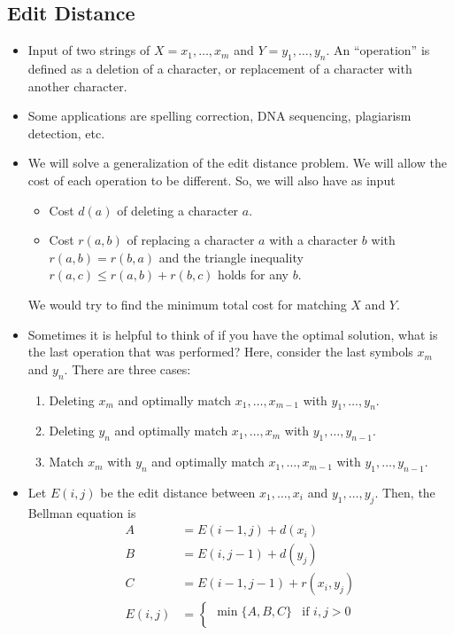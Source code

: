 \documentclass[a4paper,12pt]{article}
\begin{document}
\subsection{Edit Distance}
\begin{itemize}
    \item Input of two strings of $X=x_1,\dots,x_m$ and $Y=y_1,\dots,y_n$. An ``operation'' is defined as a deletion of a character, or replacement of a character with another character.
    \item Some applications are spelling correction, DNA sequencing, plagiarism detection, etc.
    \item We will solve a generalization of the edit distance problem. We will allow the cost of each operation to be different. So, we will also have as input \begin{itemize}
        \item Cost $d(a)$ of deleting a character $a$.
        \item Cost $r(a,b)$ of replacing a character $a$ with a character $b$ with $r(a,b)=r(b,a)$ and the triangle inequality $r(a,c)\leq r(a,b)+r(b,c)$ holds for any $b.$
    \end{itemize}
    We would try to find the minimum total cost for matching $X$ and $Y.$
    \item Sometimes it is helpful to think of if you have the optimal solution, what is the last operation that was performed? Here, consider the last symbols $x_m$ and $y_n.$ There are three cases:
    \begin{enumerate}[label=(Case \Alph*)]
        \item Deleting $x_m$ and optimally match $x_1,\dots,x_{m-1}$ with $y_1,\dots,y_n.$
        \item Deleting $y_n$ and optimally match $x_1,\dots,x_m$ with $y_1,\dots,y_{n-1}.$
        \item Match $x_m$ with $y_n$ and optimally match $x_1,\dots,x_{m-1}$ with $y_1,\dots,y_{n-1}.$
    \end{enumerate}
    \item Let $E(i,j)$ be the edit distance between $x_1,\dots,x_i$ and $y_1,\dots,y_j.$ Then, the Bellman equation is \begin{align}
        A&=E(i-1,j)+d(x_i)\\
        B&=E(i,j-1)+d(y_j)\\
        C&=E(i-1,j-1)+r(x_i,y_j)\\
        E(i,j)&=\begin{cases}
            \min\{A,B,C\}&\text{if $i,j>0$}\\

\end{cases}
\end{align}
\end{itemize}
\end{document}
